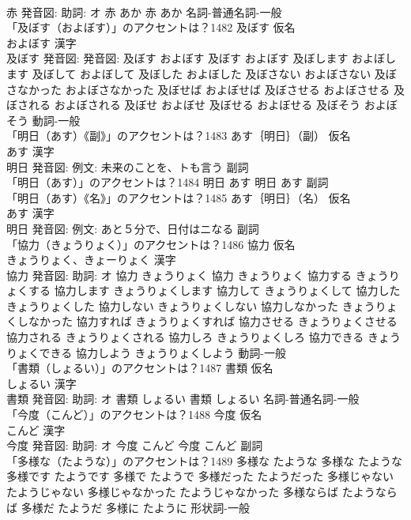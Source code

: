 \documentclass[8pt]{extreport}
\begin{document}
\begin{CJK}{UTF8}{min}
\\	赤 発音図: 助詞: オ	赤 あか		赤 あか				名詞-普通名詞-一般 
\\	「及ぼす（およぼす）」のアクセントは？1482	及ぼす 仮名　
\\	およぼす 漢字　
\\	及ぼす 発音図: 発音図:	及ぼす およぼす		及ぼす およぼす 及ぼします およぼします 及ぼして およぼして 及ぼした およぼした 及ぼさない およぼさない 及ぼさなかった およぼさなかった 及ぼせば およぼせば 及ぼさせる およぼさせる 及ぼされる およぼされる 及ぼせ およぼせ 及ぼせる およぼせる 及ぼそう およぼそう				動詞-一般 
\\	「明日（あす）《副》」のアクセントは？1483	あす｛明日｝（副） 仮名　
\\	あす 漢字　
\\	明日 発音図: 例文: 未来のことを、トも言う							副詞 
\\	「明日（あす）」のアクセントは？1484		明日 あす		明日 あす				副詞 
\\	「明日（あす）《名》」のアクセントは？1485	あす｛明日｝（名） 仮名　
\\	あす 漢字　
\\	明日 発音図: 例文: あと５分で、日付はニなる							副詞 
\\	「協力（きょうりょく）」のアクセントは？1486	協力 仮名　
\\	きょうりょく、きょーりょく 漢字　
\\	協力 発音図: 助詞: オ	協力 きょうりょく		協力 きょうりょく 協力する きょうりょくする 協力します きょうりょくします 協力して きょうりょくして 協力した きょうりょくした 協力しない きょうりょくしない 協力しなかった きょうりょくしなかった 協力すれば きょうりょくすれば 協力させる きょうりょくさせる 協力される きょうりょくされる 協力しろ きょうりょくしろ 協力できる きょうりょくできる 協力しよう きょうりょくしよう				動詞-一般 
\\	「書類（しょるい）」のアクセントは？1487	書類 仮名　
\\	しょるい 漢字　
\\	書類 発音図: 助詞: オ	書類 しょるい		書類 しょるい				名詞-普通名詞-一般 
\\	「今度（こんど）」のアクセントは？1488	今度 仮名　
\\	こんど 漢字　
\\	今度 発音図: 助詞: オ	今度 こんど		今度 こんど				副詞 
\\	「多様な（たような）」のアクセントは？1489		多様な たような		多様な たような 多様です たようです 多様で たようで 多様だった たようだった 多様じゃない たようじゃない 多様じゃなかった たようじゃなかった 多様ならば たようならば 多様だ たようだ 多様に たように				形状詞-一般 

\end{CJK}
\end{document}
